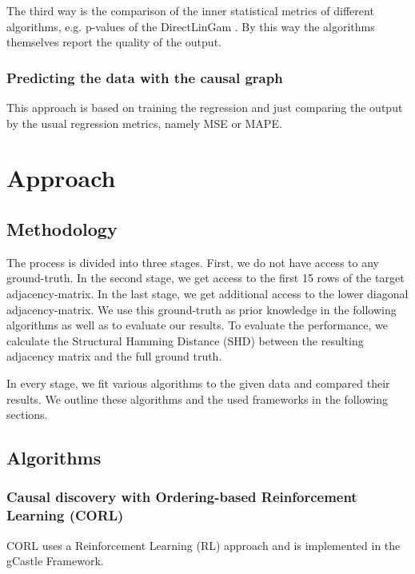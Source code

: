 \documentclass{article}
\begin{document}
	The third way is the comparison of the inner statistical metrics of different algorithms, e.g. p-values of the DirectLinGam \cite{lingam}. By this way the algorithms themselves report the quality of the output.
	
	\subsubsection{Predicting the data with the causal graph}
	
	This approach is based on training the regression and just comparing the output by the usual regression metrics, namely MSE or MAPE.
	
    \section{Approach} %

    \subsection{Methodology}

    The process is divided into three stages. First, we do not have access to any ground-truth. In the second stage, we get access to the first 15 rows of the target adjacency-matrix. In the last stage, we get additional access to the lower diagonal adjacency-matrix. We use this ground-truth as prior knowledge in the following algorithms as well as to evaluate our results. To evaluate the performance, we calculate the Structural Hamming Distance (SHD) between the resulting adjacency matrix and the full ground truth.

    In every stage, we fit various algorithms to the given data and compared their results. We outline these algorithms and the used frameworks in the following sections.

    \subsection{Algorithms}
    
    \subsubsection{Causal discovery with Ordering-based Reinforcement
    Learning (CORL)}
    CORL\cite{CORL} uses a Reinforcement Learning (RL) approach and is implemented in the gCastle Framework. 
\end{document}

